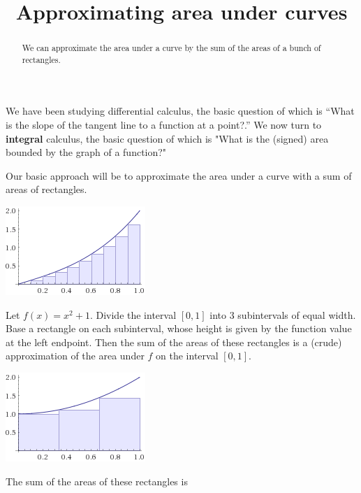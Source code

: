 \documentclass{ximera}
\title{Approximating area under curves}
\begin{document}
\begin{abstract}
	We can approximate the area under a curve by the sum of the areas of a bunch of rectangles.	
\end{abstract}

\maketitle

We have been studying differential calculus, the basic question of
which is ``What is the slope of the tangent line to a function at a
point?.''  We now turn to \textbf{integral} calculus, the basic
question of which is "What is the (signed) area bounded by the graph
of a function?"

Our basic approach will be to approximate the area under a curve with
a sum of areas of rectangles.

\begin{image}
\includegraphics{riemann0.png}
\end{image}

\begin{question}
  Let $f(x) = x^2+1$.  Divide the interval $[0,1]$ into $3$
  subintervals of equal width.  Base a rectangle on each subinterval,
  whose height is given by the function value at the left endpoint.
  Then the sum of the areas of these rectangles is a (crude)
  approximation of the area under $f$ on the interval $[0,1]$.

\begin{image}
\includegraphics{riemann1.png}
\end{image}
	
  The sum of the areas of these rectangles is 
\end{question}
\end{document}

